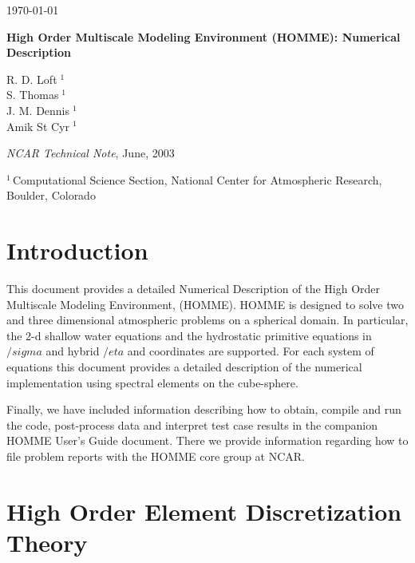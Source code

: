 \documentclass[12pt]{article}
\numberwithin{equation}{section}
\begin{document}
\setcounter{page}{2}
{\raggedleft \hfill\today}
\sloppy

\vspace{4cm}

\begin{center}
   {\bf {\LARGE  High Order Multiscale Modeling Environment (HOMME): Numerical Description}}

\vspace{2cm}
R. D. Loft$\;^1$\\
S. Thomas$\;^1$\\
J. M. Dennis$\;^1$\\
Amik St Cyr$\;^1$

\vspace{2cm}

{\it NCAR Technical Note}, June, 2003

\vspace{4cm}

{\small $^1\,$Computational Science Section, National Center for Atmospheric
  Research, Boulder, Colorado}
\end{center}

\newpage
\pagestyle{plain}
\tableofcontents

\newpage

\setcounter{page}{1}

\section{Introduction}

This document provides a detailed Numerical Description of the High Order Multiscale Modeling Environment, (HOMME). HOMME is designed to solve two and three dimensional atmospheric problems on a spherical domain. In particular,  the 2-d shallow water equations and  the hydrostatic primitive equations in $/sigma$ and hybrid $/eta$ and coordinates are supported. For each system of equations this document provides a detailed description of the numerical implementation using spectral elements on the cube-sphere.

Finally, we have included information describing how to obtain, compile and run the code, post-process data and interpret test case results in the companion HOMME User's Guide document. There we provide information regarding how to file problem reports with the HOMME core group at NCAR.


\section{High Order Element Discretization Theory }
\end{document}
